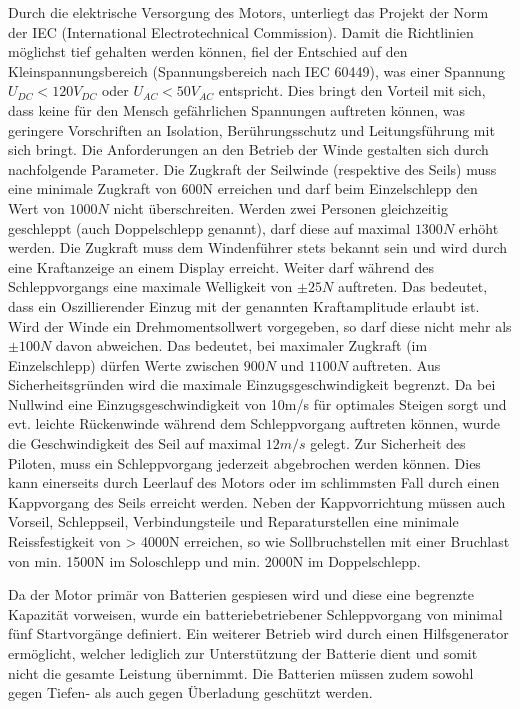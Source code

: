 Durch die elektrische Versorgung des Motors, unterliegt das Projekt der Norm der IEC (International Electrotechnical Commission). Damit die Richtlinien möglichst tief gehalten werden können, fiel der Entschied auf den Kleinspannungsbereich (Spannungsbereich  nach IEC 60449), was einer Spannung $U_{DC}<120V_{DC}$ oder $U_{AC}<50V_{AC}$ entspricht. Dies bringt den Vorteil mit sich, dass keine für den Mensch gefährlichen Spannungen auftreten können, was geringere Vorschriften an Isolation, Berührungsschutz und Leitungsführung mit sich bringt.
Die Anforderungen an den Betrieb der Winde gestalten sich durch nachfolgende Parameter. Die Zugkraft der Seilwinde (respektive des Seils) muss eine minimale Zugkraft von 600N erreichen und darf beim Einzelschlepp den Wert von $ 1000N $ nicht überschreiten. Werden zwei Personen gleichzeitig geschleppt (auch Doppelschlepp genannt), darf diese auf maximal $ 1300N $ erhöht werden. Die Zugkraft muss dem Windenführer stets bekannt sein und wird durch eine Kraftanzeige an einem Display erreicht.
Weiter darf während des Schleppvorgangs eine maximale Welligkeit von $\pm 25N$ auftreten. Das bedeutet, dass ein Oszillierender Einzug mit der genannten Kraftamplitude erlaubt ist. Wird der Winde ein Drehmomentsollwert vorgegeben, so darf diese nicht mehr als $\pm 100N$ davon abweichen. Das bedeutet, bei maximaler Zugkraft (im Einzelschlepp) dürfen Werte zwischen $ 900N $ und $ 1100N $ auftreten. Aus Sicherheitsgründen wird die maximale Einzugsgeschwindigkeit begrenzt. Da bei Nullwind eine Einzugsgeschwindigkeit von 10m/s für optimales Steigen sorgt und evt. leichte Rückenwinde während dem Schleppvorgang auftreten können, wurde die Geschwindigkeit des Seil auf maximal $ 12m/s $ gelegt.
Zur Sicherheit des Piloten, muss ein Schleppvorgang jederzeit abgebrochen werden können. Dies kann einerseits durch Leerlauf des Motors oder im schlimmsten Fall durch einen Kappvorgang des Seils erreicht werden. Neben der Kappvorrichtung müssen auch Vorseil, Schleppseil, Verbindungsteile und Reparaturstellen eine minimale Reissfestigkeit von > 4000N erreichen, so wie Sollbruchstellen mit einer Bruchlast von min. 1500N im Soloschlepp und min. 2000N im Doppelschlepp.


Da der Motor primär von Batterien gespiesen wird und diese eine begrenzte Kapazität vorweisen, wurde ein batteriebetriebener Schleppvorgang von minimal fünf Startvorgänge definiert. Ein weiterer Betrieb wird durch einen Hilfsgenerator ermöglicht, welcher lediglich zur Unterstützung der Batterie dient und somit nicht die gesamte Leistung übernimmt. Die Batterien müssen zudem sowohl gegen Tiefen- als auch gegen Überladung geschützt werden.